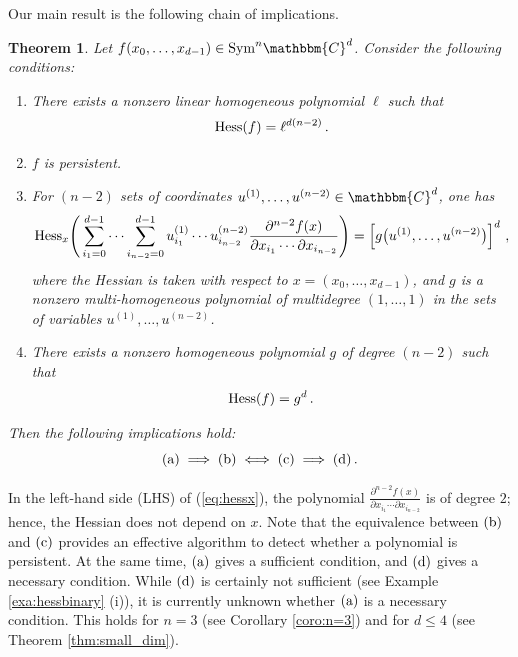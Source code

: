 \documentclass[aps,floatfix,groupedaddress,superscriptaddress,longbibliography,footinbib,notitlepage,showpacs]{revtex4-1}
\def\Hess{{\rm Hess}}
\newtheorem{theorem}{Theorem}
\begin{document}
Our main result is the following chain of implications.

\begin{theorem}\label{thm:main}
Let $f(x_0,\ldots, x_{d-1})\in\mathrm{Sym}^n\mathbbm{C}^d$. Consider the following conditions:
\begin{enumerate}[label=(\alph*), font=\normalfont]
\item There exists a nonzero linear homogeneous polynomial $\ell$ such that
\begin{equation}
\Hess(f)=\ell^{d(n-2)}\,.
\end{equation}
\item $f$ is persistent.
\item For $(n-2)$ sets of coordinates $u^{(1)},\ldots,u^{(n-2)} \in \mathbbm{C}^d$, one has
\begin{equation}\label{eq:hessx}
\Hess_x\Bigg(\sum_{i_1=0}^{d-1}\cdots\sum_{i_{n-2}=0}^{d-1} u^{(1)}_{i_1}\cdots u^{(n-2)}_{i_{n-2}}
\frac{\partial^{n-2}f(x)}{\partial x_{i_1}\cdots\partial {x_{i_{n-2}}}}\Bigg) = \left[g\big(u^{(1)},\ldots, u^{(n-2)}\big)\right]^d\,,
\end{equation}
where the Hessian is taken with respect to $x=(x_0,\ldots,x_{d-1})$, and $g$ is a nonzero multi-homogeneous polynomial of multidegree $(1,\ldots,1)$  in the sets of variables $u^{(1)},\ldots,u^{(n-2)}$.
\item There exists a nonzero homogeneous polynomial $g$ of degree $(n-2)$ such that
\begin{equation}
\Hess(f)=g^{d}\,.
\end{equation}
\end{enumerate}
Then the following implications hold:
\[
(\textnormal{a}) \;\Longrightarrow\; (\textnormal{b})
\;\Longleftrightarrow\; (\textnormal{c}) \;\Longrightarrow\; (\textnormal{d})\,.
\]
\end{theorem}

In the left-hand side (LHS) of (\ref{eq:hessx}), the polynomial $\frac{\partial^{n-2}f(x)}{\partial x_{i_1}\cdots\partial x_{i_{n-2}}}$ is of degree $2$; hence, the Hessian does not depend on $x$. Note that the equivalence between $(\textnormal{b})$ and $(\textnormal{c})$ provides an effective algorithm to detect whether a polynomial is persistent. At the same time, $(\textnormal{a})$ gives a sufficient condition, and $(\textnormal{d})$ gives a necessary condition. While $(\textnormal{d})$ is certainly not sufficient (see Example \ref{exa:hessbinary} (i)), it is currently unknown whether $(\textnormal{a})$ is a necessary condition. This holds for $n=3$ (see Corollary \ref{coro:n=3}) and for $d\leq 4$ (see Theorem \ref{thm:small_dim}).
\end{document}
